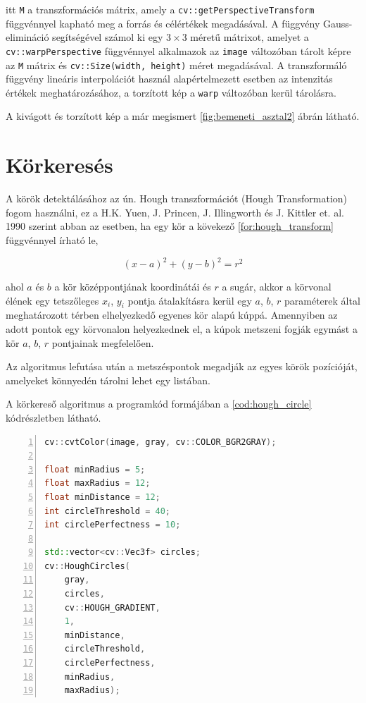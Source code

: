 \par itt \lstinline{M} a transzformációs mátrix, amely a \lstinline{cv::getPerspectiveTransform} függvénnyel \cite{opencv_docs} kapható meg a forrás és célértékek megadásával. A függvény Gauss-elimináció \cite{grcar2011mathematicians} segítségével számol ki egy $3\times3$ méretű mátrixot, amelyet a \lstinline{cv::warpPerspective} függvénnyel \cite{opencv_docs} alkalmazok az \lstinline{image} változóban tárolt képre az \lstinline{M} mátrix és \lstinline{cv::Size(width, height)} méret megadásával. A transzformáló függvény lineáris interpolációt \cite{blu0401interpolation} használ alapértelmezett esetben az intenzitás értékek meghatározásához, a torzított kép a \lstinline{warp} változóban kerül tárolásra.
\par A kivágott és torzított kép a már megismert \ref{fig:bemeneti_asztal2} ábrán látható.

\section{Körkeresés}
A körök detektálásához az ún. Hough transzformációt (Hough Transformation) fogom használni, ez a H.K. Yuen, J. Princen, J. Illingworth és J. Kittler et. al. 1990 \cite{YUEN199071} szerint abban az esetben, ha egy kör a kövekező \ref{for:hough_transform} függvénnyel írható le,

\begin{equation}
    (x - a)^2 + (y - b)^2 = r^2
    \label{for:hough_transform}
\end{equation}

\par ahol $a$ és $b$ a kör középpontjának koordinátái és $r$ a sugár, akkor a körvonal élének egy tetszőleges $x_i$, $y_i$ pontja átalakításra kerül egy $a$, $b$, $r$ paraméterek által meghatározott térben elhelyezkedő egyenes kör alapú kúppá.\cite{hough_transform,YUEN199071} Amennyiben az adott pontok egy körvonalon helyezkednek el, a kúpok metszeni fogják egymást a kör $a$, $b$, $r$ pontjainak megfelelően.\cite{YUEN199071}
\par Az algoritmus lefutása után a metszéspontok megadják az egyes körök pozícióját, amelyeket könnyedén tárolni lehet egy listában.
\par A körkereső algoritmus a programkód formájában a \ref{cod:hough_circle} kódrészletben látható.

\begin{codewrapper}
\begin{lstlisting}[language=C++, numbers=left, caption={A körkereső algoritmus.}, label={cod:hough_circle}]
cv::cvtColor(image, gray, cv::COLOR_BGR2GRAY);

float minRadius = 5;
float maxRadius = 12;
float minDistance = 12;
int circleThreshold = 40;
int circlePerfectness = 10;

std::vector<cv::Vec3f> circles;
cv::HoughCircles(
    gray,
    circles,
    cv::HOUGH_GRADIENT,
    1,
    minDistance,
    circleThreshold,
    circlePerfectness,
    minRadius,
    maxRadius);
\end{lstlisting}
\end{codewrapper}

